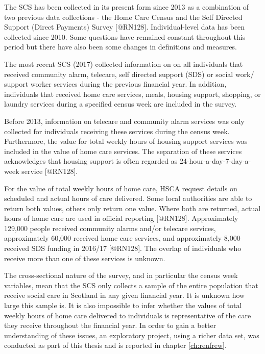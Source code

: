 \documentclass[]{article}
\begin{document}
The SCS has been collected in its present form since 2013 as a
combination of two previous data collections - the Home Care Census and
the Self Directed Support (Direct Payments) Survey {[}@RN128{]}.
Individual-level data has been collected since 2010. Some questions have
remained constant throughout this period but there have also been some
changes in definitions and measures.

The most recent SCS (2017) collected information on on all individuals
that received community alarm, telecare, self directed support (SDS) or
social work/ support worker services during the previous financial year.
In addition, individuals that received home care services, meals,
housing support, shopping, or laundry services during a specified census
week are included in the survey.

Before 2013, information on telecare and community alarm services was
only collected for individuals receiving these services during the
census week. Furthermore, the value for total weekly hours of housing
support services was included in the value of home care services. The
separation of these services acknowledges that housing support is often
regarded as 24-hour-a-day-7-day-a-week service {[}@RN128{]}.

For the value of total weekly hours of home care, HSCA request details
on scheduled and actual hours of care delivered. Some local authorities
are able to return both values, others only return one value. Where both
are returned, actual hours of home care are used in official reporting
{[}@RN128{]}. Approximately 129,000 people received community alarms
and/or telecare services, approximately 60,000 received home care
services, and approximately 8,000 received SDS funding in 2016/17
{[}@RN128{]}. The overlap of individuals who receive more than one of
these services is unknown.

The cross-sectional nature of the survey, and in particular the census
week variables, mean that the SCS only collects a sample of the entire
population that receive social care in Scotland in any given financial
year. It is unknown how large this sample is. It is also impossible to
infer whether the values of total weekly hours of home care delivered to
individuals is representative of the care they receive throughout the
financial year. In order to gain a better understanding of these issues,
an exploratory project, using a richer data set, was conducted as part
of this thesis and is reported in chapter \ref{ch:renfrew}.
\end{document}
